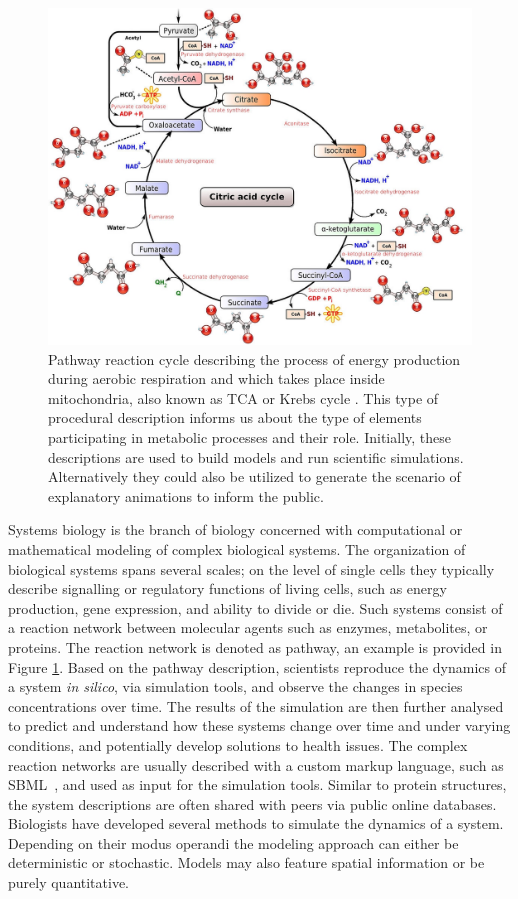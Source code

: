\begin{figure}
\centering
\includegraphics[width=0.7\linewidth]{graphics/Citric_acid_cycle_noi}
\caption{Pathway reaction cycle describing the process of energy production during aerobic respiration and which takes place inside mitochondria, also known as TCA or Krebs cycle \cite{Krebs}. This type of procedural description informs us about the type of elements participating in metabolic processes and their role. Initially, these descriptions are used to build models and run scientific simulations. Alternatively they could also be utilized to generate the scenario of explanatory animations to inform the public.}
\label{fig:reductivetcacycle}
\end{figure}

Systems biology is the branch of biology concerned with computational or mathematical modeling of complex biological systems.
The organization of biological systems spans several scales; on the level of single cells they typically describe signalling or regulatory functions of living cells, such as energy production, gene expression, and ability to divide or die.
Such systems consist of a reaction network between molecular agents such as enzymes, metabolites, or proteins.
The reaction network is denoted as pathway, an example is provided in Figure \ref{fig:reductivetcacycle}.
Based on the pathway description, scientists reproduce the dynamics of a system \textit{in silico}, via simulation tools, and observe the changes in species concentrations over time.
The results of the simulation are then further analysed to predict and understand how these systems change over time and under varying conditions, and potentially develop solutions to health issues.
The complex reaction networks are usually described with a custom markup language, such as SBML~\cite{hucka2003systems}, and used as input for the simulation tools.
Similar to protein structures, the system descriptions are often shared with peers via public online databases.
Biologists have developed several methods to simulate the dynamics of a system.
Depending on their modus operandi the modeling approach can either be deterministic or stochastic.
Models may also feature spatial information or be purely quantitative. 

